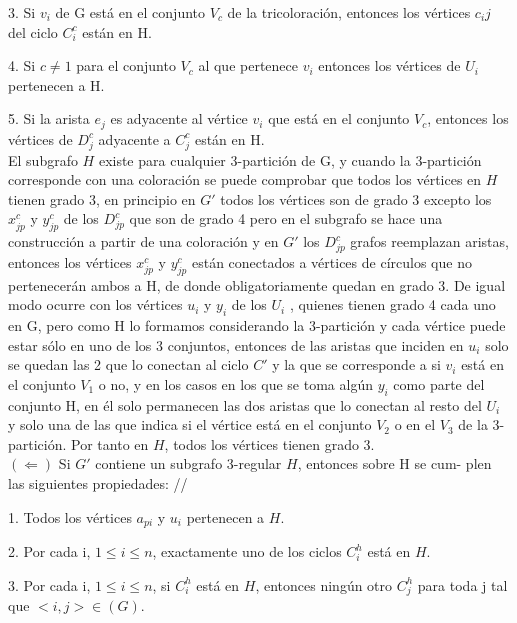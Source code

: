 \documentclass[
10pt, %
a4paper, %
oneside, %
headinclude,footinclude, %
BCOR5mm, %
]{scrartcl}
\begin{document}
3. Si $v_i$ de G est\'a en el conjunto $V_c$ de la tricoloraci\'on, entonces los v\'ertices $c_ij$ del ciclo $C^c_i$ est\'an en H.

4. Si $ c \neq 1$ para el conjunto $V_c$ al que pertenece $v_i$ entonces los vértices de $U_i$ pertenecen a H.

5. Si la arista $e_j$ es adyacente al v\'ertice $v_i$ que est\'a en el conjunto $V_c$, entonces los v\'ertices de $D^c_j$ adyacente a $C^c_j$ est\'an en H. \\


El subgrafo $H$ existe para cualquier 3-partición de G, y cuando la 3-partición corresponde con una coloración se puede comprobar que todos los vértices en
$H $tienen grado 3, en principio en $G'$ todos los vértices son de grado 3 excepto los $x_{jp}^{c}$ y $y_{jp}^{c}$ de los $D_{jp}^{c}$ que son de grado 4 pero en el subgrafo se hace 
una construcción a partir de una coloración y en $G'$ los $D_{jp}^{c}$ grafos reemplazan aristas, entonces los vértices $x_{jp}^{c}$ y $y_{jp}^{c}$ están conectados a vértices de círculos que
no pertenecerán ambos a H, de donde obligatoriamente quedan en grado 3. De
igual modo ocurre con los vértices $u_i$ y $y_i$ de los $U_i$ , quienes tienen grado 4 cada uno en G, pero como H lo formamos considerando la 3-partición y cada vértice
puede estar sólo en uno de los 3 conjuntos, entonces de las aristas que inciden
en $u_i$ solo se quedan las 2 que lo conectan al ciclo $C'$ y la que se corresponde a
si $v_i$ está en el conjunto $V_1$ o no, y en los casos en los que se toma algún $y_i$ como
parte del conjunto H, en él solo permanecen las dos aristas que lo conectan
al resto del $U_i$ y solo una de las que indica si el vértice está en el conjunto $V_2$
o en el $V_3$ de la 3-partición. Por tanto en $H$, todos los vértices tienen grado 3. \\


$(\Leftarrow )$ Si $G'$ contiene un subgrafo 3-regular $H$, entonces sobre H se cum-
plen las siguientes propiedades: //


1. Todos los vértices $a_{pi}$ y $u_i$ pertenecen a $H$.

2. Por cada i, $1 \leq i \leq n$, exactamente uno de los ciclos $C^h_i$ está en $H$.

3. Por cada i, $1 \leq i \leq n$, si $C^h_i$ está en $H$, entonces ningún otro $C^h_j$ para
toda j tal que $< i, j > \in (G)$. \\
\end{document}
